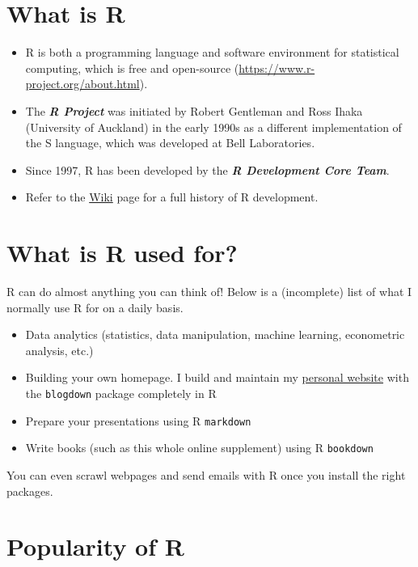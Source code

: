 \documentclass[
  11pt,
]{book}
\begin{document}
\hypertarget{what-is-r}{%
\section{What is R}\label{what-is-r}}

\begin{itemize}
\item
  R is both a programming language and software environment for statistical computing, which is free and open-source (\url{https://www.r-project.org/about.html}).
\item
  The \textbf{\emph{R Project}} was initiated by Robert Gentleman and Ross Ihaka (University of Auckland) in the early 1990s as a different implementation of the S language, which was developed at Bell Laboratories.
\item
  Since 1997, R has been developed by the \textbf{\emph{R Development Core Team}}.
\item
  Refer to the \href{https://en.wikipedia.org/wiki/R_(programming_language)}{Wiki} page for a full history of R development.
\end{itemize}

\hypertarget{what-is-r-used-for}{%
\section{What is R used for?}\label{what-is-r-used-for}}

R can do almost anything you can think of! Below is a (incomplete) list of what I normally use R for on a daily basis.

\begin{itemize}
\item
  Data analytics (statistics, data manipulation, machine learning, econometric analysis, etc.)
\item
  Building your own homepage. I build and maintain my \href{http://miaowei.netlify.app}{personal website} with the \texttt{blogdown} package completely in R
\item
  Prepare your presentations using R \texttt{markdown}
\item
  Write books (such as this whole online supplement) using R \texttt{bookdown}
\end{itemize}

You can even scrawl webpages and send emails with R once you install the right packages.

\hypertarget{popularity-of-r}{%
\section{Popularity of R}\label{popularity-of-r}}
\end{document}
